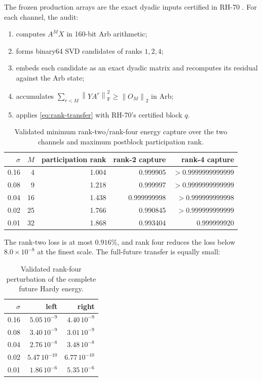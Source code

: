 \documentclass[11pt]{article}
\newcommand{\norm}[1]{\left\lVert#1\right\rVert}
\newcommand{\F}{\mathrm F}
\begin{document}
The frozen production arrays are the exact dyadic inputs certified in RH-70
\citep{WangFrozen2026}.  For each channel, the audit:
\begin{enumerate}[leftmargin=2.2em]
 \item computes $A^M X$ in 160-bit Arb arithmetic;
 \item forms binary64 SVD candidates of ranks $1,2,4$;
 \item embeds each candidate as an exact dyadic matrix and recomputes its
       residual against the Arb state;
 \item accumulates
       $\sum_{r<M}\norm{YA^r}_{\F}^2\ge\norm{O_M}_2$ in Arb;
 \item applies \eqref{eq:rank-transfer} with RH-70's certified block $q$.
\end{enumerate}

\begin{table}[H]
\centering
\small
\caption{Validated minimum rank-two/rank-four energy capture over the two
channels and maximum postblock participation rank.}
\label{tab:capture}
\begin{tabular}{@{}rrrrr@{}}
\toprule
$\sigma$ & $M$ & participation rank & rank-2 capture & rank-4 capture\\
\midrule
0.16 & 4  & 1.004 & 0.999905 & $>0.9999999999999$\\
0.08 & 9  & 1.218 & 0.999997 & $>0.9999999999999$\\
0.04 & 16 & 1.438 & 0.999999998 & $>0.999999999998$\\
0.02 & 25 & 1.766 & 0.990845 & $>0.999999999999$\\
0.01 & 32 & 1.868 & 0.993404 & 0.999999920\\
\bottomrule
\end{tabular}
\end{table}

The rank-two loss is at most $0.916\%$, and rank four reduces the loss below
$8.0\times10^{-8}$ at the finest scale.  The full-future transfer is equally
small:

\begin{table}[H]
\centering
\small
\caption{Validated rank-four perturbation of the complete future Hardy energy.}
\label{tab:future}
\begin{tabular}{@{}rrr@{}}
\toprule
$\sigma$ & left & right\\
\midrule
0.16 & $5.05\,10^{-9}$ & $4.40\,10^{-9}$\\
0.08 & $3.40\,10^{-9}$ & $3.01\,10^{-9}$\\
0.04 & $2.76\,10^{-8}$ & $3.48\,10^{-8}$\\
0.02 & $5.47\,10^{-10}$ & $6.77\,10^{-10}$\\
0.01 & $1.86\,10^{-6}$ & $5.35\,10^{-6}$\\
\bottomrule
\end{tabular}
\end{table}
\end{document}
